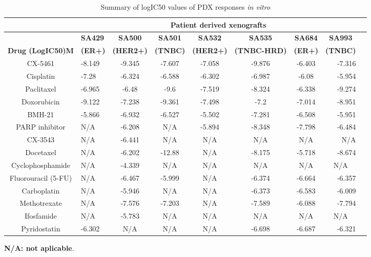  \begin{table}[htbp]
   \centering
   \caption{Summary of logIC50 values of PDX responses \textit{in vitro}}
     \begin{tabular}{|c|p{5em}|c|c|c|c|c|r|r|}
        \hline
       & \multicolumn{7}{|c|}{\textbf{Patient derived xenografts}} \\
          \hline
       & \textbf{SA429} & \textbf{SA500} & \textbf{SA501} & \textbf{SA532} & \textbf{SA535} & \multicolumn{1}{|c|}{\textbf{SA684}} & \multicolumn{1}{|c|}{\textbf{SA993}}\\
     \multicolumn{1}{|l|}{\textbf{Drug (LogIC50)M}} & \textbf{(ER+)} & \textbf{(HER2+)} & \textbf{(TNBC)} & \textbf{(HER2+)} & \textbf{(TNBC-HRD)} & \multicolumn{1}{|c|}{\textbf{(ER+)}} & \multicolumn{1}{|c|}{\textbf{(TNBC)}} \\
        \hline
     CX-5461  & -8.149 & -9.345 & -7.607 & -7.058 & -9.876 & -6.403 & -7.316 \\
     Cisplatin  & -7.28 & -6.324 & -6.588 & -6.302 & -6.987 & -6.08 & -5.954 \\
     Paclitaxel  & -6.965 & -6.48 & -9.6 & -7.519 & -8.324 & -6.338 & -9.274 \\
     Doxorubicin  & -9.122 & -7.238 & -9.361 & -7.498 & -7.2 & -7.014 & -8.951 \\
     BMH-21  & -5.866 & -6.932 & -6.527 & -5.502 & -7.281 & -6.508 & -5.951 \\
     PARP inhibitor  & N/A & -6.208 & N/A & -5.894 & -8.348 & -7.798 & -6.484 \\
     CX-3543  & N/A & -6.441 & N/A & N/A & N/A & \multicolumn{1}{|c|}{N/A} & N/A \\
     Docetaxel  & N/A & -6.202 & -12.88 & N/A & -8.175 & -5.718 & -8.674 \\
     Cyclophosphamide  & N/A & -4.339 & N/A & N/A & N/A & \multicolumn{1}{|c|}{N/A} & \multicolumn{1}{|c|}{N/A} \\
     Fluorouracil (5-FU)  & N/A & -6.467 & -5.999 & N/A & -6.374 & -6.664 & -6.357 \\
     Carboplatin  & N/A & -5.946 & N/A & N/A & -6.373 & -6.583 & -6.009 \\
     Methotrexate  & N/A & -7.576 & -7.203 & N/A & -7.589 & -6.088 & -7.794 \\
     Ifosfamide  & N/A & -5.783 & N/A & N/A & N/A & \multicolumn{1}{|c|}{N/A} & \multicolumn{1}{|c|}{N/A} \\
     Pyridostatin & -6.302 & N/A & N/A & N/A & -6.698 & -6.687 & -6.321 \\
     \hline
     \end{tabular}%
   \label{tab:invitroIC50}%
   
   
    \small\textbf{ N/A: not aplicable}.
 \end{table}%

